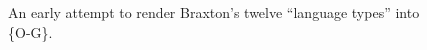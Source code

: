         \begin{figure}
            \centering
            \captionsetup{width=.5\textwidth} 
            \caption{An early attempt to render Braxton's twelve ``language types'' into \{O-G\}.}
            \label{fig:braxtonlike2}
        \end{figure}

